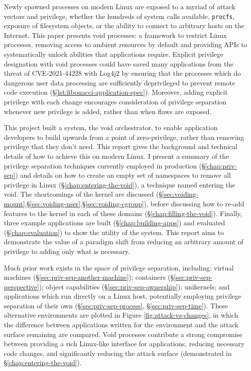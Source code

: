\documentclass[12pt,a4paper,twoside]{report}
\begin{document}
Newly spawned processes on modern Linux are exposed to a myriad of attack vectors and privilege, whether the hundreds of system calls available, \texttt{procfs}, exposure of filesystem objects, or the ability to connect to arbitrary hosts on the Internet. This paper presents void processes: a framework to restrict Linux processes, removing access to ambient resources by default and providing APIs to systematically unlock abilities that applications require. Explicit privilege designation with void processes could have saved many applications from the threat of CVE-2021-44228 with Log4j2 by ensuring that the processes which do dangerous user data processing are sufficiently deprivileged to prevent remote code execution (§\ref{lst:fibonacci-application-spec}). Moreover, adding explicit privilege with each change encourages consideration of privilege separation whenever new privilege is added, rather than when flaws are exposed.

This project built a system, the void orchestrator, to enable application developers to build upwards from a point of zero-privilege, rather than removing privilege that they don't need. This report gives the background and technical details of how to achieve this on modern Linux. I present a summary of the privilege separation techniques currently employed in production (§\ref{chap:priv-sep}) and details on how to create an empty set of namespaces to remove all privilege in Linux (§\ref{chap:entering-the-void}), a technique named entering the void. The shortcomings of the kernel are discussed (§\ref{sec:voiding-mount},§\ref{sec:voiding-user},§\ref{sec:voiding-cgroup}), before discussing how to re-add features to the kernel in each of these domains (§\ref{chap:filling-the-void}). Finally, three example applications are built (§\ref{chap:building-apps}) and evaluated (§\ref{chap:evaluation}) to show the utility of the system. This report aims to demonstrate the value of a paradigm shift from reducing an arbitrary amount of privilege to adding only what is necessary.

Much prior work exists in the space of privilege separation, including: virtual machines (§\ref{sec:priv-sep-another-machine}); containers (§\ref{sec:priv-sep-perspective}); object capabilities (§\ref{sec:priv-sep-ownership}); unikernels; and applications which run directly on a Linux host, potentially employing privilege separation of their own (§\ref{sec:priv-sep-process}, §\ref{sec:priv-sep-time}). These alternative environments are plotted in Figure \ref{fig:attack-vs-changes}, in which the difference between applications written for the environment and the attack surface remaining are compared. Void processes contribute a strong compromise between providing a rich Linux-like interface for applications, reducing necessary code changes, and significantly reducing the attack surface (demonstrated in §\ref{chap:entering-the-void}).
\end{document}
